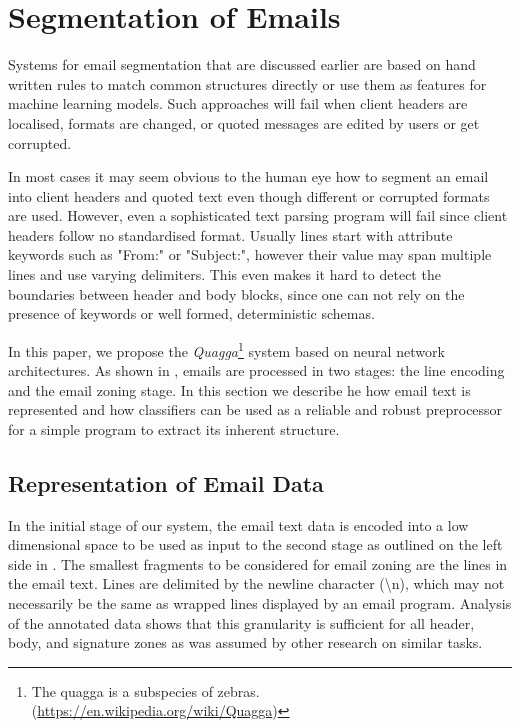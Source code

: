 \documentclass{llncs}
\begin{document}




\newpage
\section{Segmentation of Emails}
\label{sec:model}
Systems for email segmentation that are discussed earlier are based on hand written rules to match common structures directly or use them as features for machine learning models.
Such approaches will fail when client headers are localised, formats are changed, or quoted messages are edited by users or get corrupted.

In most cases it may seem obvious to the human eye how to segment an email into client headers and quoted text even though different or corrupted formats are used.
However, even a sophisticated text parsing program will fail since client headers follow no standardised format.
Usually lines start with attribute keywords such as "From:" or "Subject:", however their value may span multiple lines and use varying delimiters.
This even makes it hard to detect the boundaries between header and body blocks, since one can not rely on the presence of keywords or well formed, deterministic schemas.

\begin{figure}
\end{figure}

In this paper, we propose the \textit{Quagga}\footnote{The quagga is a subspecies of zebras. (\url{https://en.wikipedia.org/wiki/Quagga})} system based on neural network architectures.
As shown in , emails are processed in two stages: the line encoding and the email zoning stage.
In this section we describe he how email text is represented and how classifiers can be used as a reliable and robust preprocessor for a simple program to extract its inherent structure.

\subsection{Representation of Email Data}
In the initial stage of our system, the email text data is encoded into a low dimensional space to be used as input to the second stage as outlined on the left side in .
The smallest fragments to be considered for email zoning are the lines in the email text.
Lines are delimited by the newline character (\textbackslash n), which may not necessarily be the same as wrapped lines displayed by an email program.
Analysis of the annotated data shows that this granularity is sufficient for all header, body, and signature zones as was assumed by other research on similar tasks.
\end{document}
